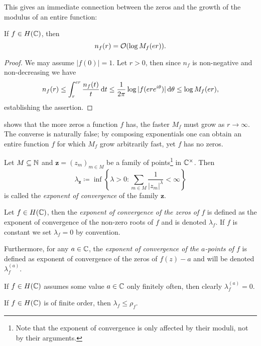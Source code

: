 This gives an immediate connection between the zeros and the growth of the modulus of an entire function:

\begin{lemma} \label{lem:zeros-bounded-by-modulus}
    If $f \in H(\mathbb{C})$, then
    $$ n_f(r) = \mathcal{O}( \log M_f(er) ). $$
\end{lemma}

\begin{proof}
    We may assume $\vert f(0) \vert = 1$. Let $r > 0$, then since $n_f$ is non-negative and non-decreasing we have
    \begin{equation*}
        n_f(r) \leq \int_r^{er} \frac{n_f(t)}{t} \mathop{}\!\mathrm{d} t \leq \frac{1}{2 \pi} \log \vert f(er e^{i \theta}) \vert \mathop{}\!\mathrm{d} \theta \leq \log M_f(er),
    \end{equation*}
    establishing the assertion.
\end{proof}

 shows that the more zeros a function $f$ has, the faster $M_f$ must grow as $r \to \infty$. The converse is naturally false; by composing exponentials one can obtain an entire function $f$ for which $M_f$ grow arbitrarily fast, yet $f$ has no zeros.

\begin{definition} \label{def:zero-exponent}
    Let $M \subseteq \mathbb{N}$ and $\mathbf{z} = (z_m)_{m \in M}$ be a family of points\footnote{Note that the exponent of convergence is only affected by their moduli, not by their arguments.} in $\mathbb{C}^\times$. Then
    $$ \lambda_{\mathbf{z}} \coloneqq \inf \left\{ \lambda > 0 : \sum_{m \in M} \frac{1}{\vert z_m \vert^\lambda} < \infty \right\} $$
    is called the \emph{exponent of convergence} of the family $\mathbf{z}$.

    Let $f \in H(\mathbb{C})$, then the \emph{exponent of convergence of the zeros of $f$} is defined as the exponent of convergence of the non-zero roots of $f$ and is denoted $\lambda_f$. If $f$ is constant we set $\lambda_f = 0$ by convention.

    Furthermore, for any $a \in \mathbb{C}$, the \emph{exponent of convergence of the $a$-points of $f$} is defined as exponent of convergence of the zeros of $f(z) - a$ and will be denoted $\lambda_f^{(a)}$.
\end{definition}

If $f \in H(\mathbb{C})$ assumes some value $a \in \mathbb{C}$ only finitely often, then clearly $\lambda_f^{(a)} = 0$.

\begin{theorem} \label{thm:inequality-order-exponent-of-convergence}
    If $f \in H(\mathbb{C})$ is of finite order, then $\lambda_f \leq \rho_f$.
\end{theorem}

